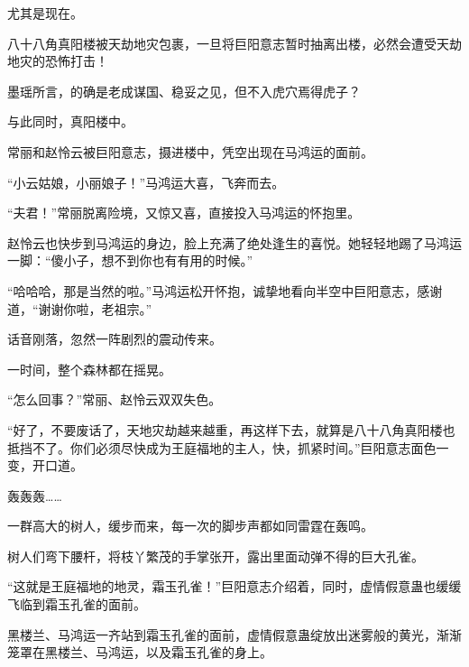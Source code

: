 \begin{this_body}
尤其是现在。

八十八角真阳楼被天劫地灾包裹，一旦将巨阳意志暂时抽离出楼，必然会遭受天劫地灾的恐怖打击！

墨瑶所言，的确是老成谋国、稳妥之见，但不入虎穴焉得虎子？

与此同时，真阳楼中。

常丽和赵怜云被巨阳意志，摄进楼中，凭空出现在马鸿运的面前。

“小云姑娘，小丽娘子！”马鸿运大喜，飞奔而去。

“夫君！”常丽脱离险境，又惊又喜，直接投入马鸿运的怀抱里。

赵怜云也快步到马鸿运的身边，脸上充满了绝处逢生的喜悦。她轻轻地踢了马鸿运一脚：“傻小子，想不到你也有有用的时候。”

“哈哈哈，那是当然的啦。”马鸿运松开怀抱，诚挚地看向半空中巨阳意志，感谢道，“谢谢你啦，老祖宗。”

话音刚落，忽然一阵剧烈的震动传来。

一时间，整个森林都在摇晃。

“怎么回事？”常丽、赵怜云双双失色。

“好了，不要废话了，天地灾劫越来越重，再这样下去，就算是八十八角真阳楼也抵挡不了。你们必须尽快成为王庭福地的主人，快，抓紧时间。”巨阳意志面色一变，开口道。

轰轰轰……

一群高大的树人，缓步而来，每一次的脚步声都如同雷霆在轰鸣。

树人们弯下腰杆，将枝丫繁茂的手掌张开，露出里面动弹不得的巨大孔雀。

“这就是王庭福地的地灵，霜玉孔雀！”巨阳意志介绍着，同时，虚情假意蛊也缓缓飞临到霜玉孔雀的面前。

黑楼兰、马鸿运一齐站到霜玉孔雀的面前，虚情假意蛊绽放出迷雾般的黄光，渐渐笼罩在黑楼兰、马鸿运，以及霜玉孔雀的身上。

\end{this_body}


